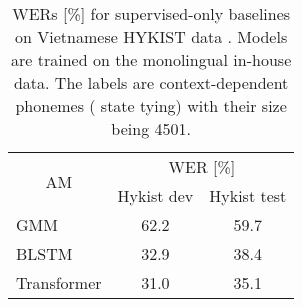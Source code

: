 \begin{table}[!ht]
\centering
\begin{adjustbox}{width=0.6\columnwidth,center}
\begin{tabular}{|l|c|c|} 
\hline
\multicolumn{1}{|c|}{\multirow{2}{*}{AM}} & \multicolumn{2}{c|}{WER [\%]}  \\ 
\cline{2-3}
\multicolumn{1}{|c|}{}                    & Hykist dev & Hykist test       \\ 
\hline
GMM                                       & 62.2       & 59.7              \\ 
\hline
BLSTM                                     & 32.9       & 38.4              \\ 
\hline
Transformer                               & 31.0       & 35.1              \\
\hline
\end{tabular}
\end{adjustbox}
\caption{\Glspl{WER} [\%] for supervised-only baselines on Vietnamese HYKIST data \cite{luescher2022:hykist}. Models are trained on the monolingual in-house data. The labels are context-dependent phonemes ( state tying) with their size being 4501.}
\label{table:supervised_baselines}
\end{table}



